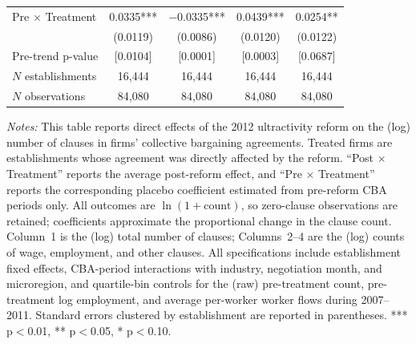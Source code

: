 \begin{table}[!htbp]
\begin{tabular}{lcccc}
Pre $\times$ Treatment & 0.0335*** & $-$0.0335*** & 0.0439*** & 0.0254**\\
 & (0.0119) & (0.0086) & (0.0120) & (0.0122)\\
Pre-trend p-value & [0.0104] & [0.0001] & [0.0003] & [0.0687]\\
$N$ establishments & 16{,}444 & 16{,}444 & 16{,}444 & 16{,}444\\
$N$ observations & 84{,}080 & 84{,}080 & 84{,}080 & 84{,}080\\
\bottomrule
\end{tabular}
\begin{minipage}{\linewidth}
\footnotesize\vspace{4pt}
\textit{Notes:} This table reports direct effects of the 2012 ultractivity reform on the (log) number of clauses in firms' collective bargaining agreements. Treated firms are establishments whose agreement was directly affected by the reform. ``Post $\times$ Treatment'' reports the average post-reform effect, and ``Pre $\times$ Treatment'' reports the corresponding placebo coefficient estimated from pre-reform CBA periods only. All outcomes are $\ln(1 + \text{count})$, so zero-clause observations are retained; coefficients approximate the proportional change in the clause count. Column~1 is the (log) total number of clauses; Columns~2--4 are the (log) counts of wage, employment, and other clauses. All specifications include establishment fixed effects, CBA-period interactions with industry, negotiation month, and microregion, and quartile-bin controls for the (raw) pre-treatment count, pre-treatment log employment, and average per-worker worker flows during 2007--2011. Standard errors clustered by establishment are reported in parentheses. *** p$<$0.01, ** p$<$0.05, * p$<$0.10.
\end{minipage}
\end{table}
